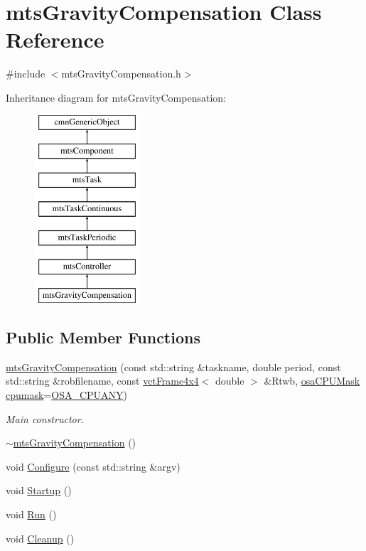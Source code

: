 \hypertarget{classmts_gravity_compensation}{}\section{mts\+Gravity\+Compensation Class Reference}
\label{classmts_gravity_compensation}


{\ttfamily \#include $<$mts\+Gravity\+Compensation.\+h$>$}

Inheritance diagram for mts\+Gravity\+Compensation\+:\begin{figure}[H]
\begin{center}
\leavevmode
\includegraphics[height=7.000000cm]{d3/df8/classmts_gravity_compensation}
\end{center}
\end{figure}
\subsection*{Public Member Functions}
\begin{DoxyCompactItemize}
\item 
\hyperlink{classmts_gravity_compensation_a1b3a369e9f9633bc2634eb77a28f87db}{mts\+Gravity\+Compensation} (const std\+::string \&taskname, double period, const std\+::string \&robfilename, const \hyperlink{classvct_frame4x4}{vct\+Frame4x4}$<$ double $>$ \&Rtwb, \hyperlink{osa_c_p_u_affinity_8h_aaec7cdd7797e5e6eb5438c15fee5477a}{osa\+C\+P\+U\+Mask} \hyperlink{classmts_controller_a3125e5e9b65dc2347725215e8af73c9f}{cpumask}=\hyperlink{osa_c_p_u_affinity_8h_a2ae5ea257830cff2814d81ce526ada35}{O\+S\+A\+\_\+\+C\+P\+U\+A\+N\+Y})
\begin{DoxyCompactList}\small\item\em Main constructor. \end{DoxyCompactList}\item 
\hyperlink{classmts_gravity_compensation_a312a64260a6619fe8bf927dc2eeaf32a}{$\sim$mts\+Gravity\+Compensation} ()
\item 
void \hyperlink{classmts_gravity_compensation_afeb995f4fc2dcfa36f058d2daa4ca122}{Configure} (const std\+::string \&argv)
\item 
void \hyperlink{classmts_gravity_compensation_aa6d2d14d2980a33229624fa7462de7c3}{Startup} ()
\item 
void \hyperlink{classmts_gravity_compensation_a4434cc931c8e6069450b78b5ad83792d}{Run} ()
\item 
void \hyperlink{classmts_gravity_compensation_a207284822f031b9eef14414f77badbff}{Cleanup} ()
\end{DoxyCompactItemize}

